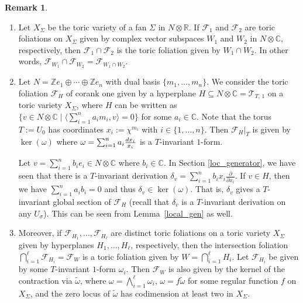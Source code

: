 \documentclass[12pt,reqno]{amsart}
\theoremstyle{definition}
\newtheorem{remark}[theorem]{Remark}
\newcommand{\mc}{\mathcal}
\newcommand\cF{{\mathcal{F}}}
\newcommand\cT{{\mathcal{T}}}
\newcommand\bC{{\mathbb C}}
\newcommand\bR{{\mathbb R}}
\newcommand\bZ{{\mathbb Z}}
\newcommand{\diff}{\textnormal{d}}
\begin{document}
\begin{remark}\label{rmk_properties}
\begin{enumerate}
    \item Let $X_\Sigma$ be the toric variety of a fan $\Sigma$ in $N\otimes\bR$. 
    If $\cF_1$ and $\cF_2$ are toric foliations on $X_\Sigma$ given by complex vector subspaces $W_1$ and $W_2$ in $N\otimes\bC$, respectively, then $\cF_1\cap\cF_2$ is the toric foliation given by $W_1\cap W_2$. 
    In other words, $\cF_{W_1}\cap\cF_{W_2} = \cF_{W_1\cap W_2}$. 
    
    \item Let $N=\bZ e_1\oplus\cdots\oplus\bZ e_n$ with dual basis $\{m_1,\ldots,m_n\}$. 
    We consider the toric foliation $\cF_H$ of corank one given by a hyperplane $H\subseteq N\otimes\bC = \cT_{T,\,1}$ on a toric variety $X_\Sigma$, where $H$ can be written as $\{v\in N\otimes\bC\mid \big\langle \sum_{i=1}^n a_im_i, v\big\rangle = 0\}$ for some $a_i\in\bC$. 
    Note that the torus $T:=U_{0}$ has coordinates $x_i:=\chi^{m_i}$ with $i\in \{1,\ldots,n\}$.  
    Then $\cF_H\vert_T$ is given by $\ker(\omega)$ where $\omega=\sum_{i=1}^n a_i\frac{\diff x_i}{x_i}$ is a $T$-invariant $1$-form. 

    Let $v=\sum_{i=1}^n b_ie_i \in N\otimes\bC$ where $b_i\in\bC$. 
    In Section \ref{loc_generator}, we have seen that there is a $T$-invariant derivation $\delta_v=\sum_{i=1}^n b_ix_i\frac{\partial}{\partial x_i}$.
    If $v\in H$, then we have $\sum_{i=1}^n a_ib_i=0$ and thus
    $\delta_v\in\ker(\omega)$. That is, $\delta_v$ gives a $T$-invariant global section of $\mc F_H$ (recall that $\delta_v$ is a $T$-invariant derivation on any $U_\sigma$). This can be seen from Lemma~\ref{local_gen} as well.

    \item Moreover, if $\cF_{H_1},\ldots,\cF_{H_\ell}$ are distinct toric foliations on a toric variety $X_\Sigma$ given by hyperplanes $H_1,\ldots,H_\ell$, respectively, then the intersection foliation $\bigcap_{i=1}^\ell\cF_{H_i} = \cF_W$ is a toric foliation given by $W=\bigcap_{i=1}^\ell H_i$. 
    Let $\cF_{H_i}$ be given by some $T$-invariant $1$-form $\omega_i$. 
    Then $\cF_W$ is also given by the kernel of the contraction via $\tilde{\omega}$, where $\omega=\bigwedge_{i=1}^\ell\omega_i$, $\omega=f\tilde{\omega}$ for some regular function $f$ on $X_\Sigma$, and the zero locus of $\tilde{\omega}$ has codimension at least two in $X_\Sigma$. 
\end{enumerate}
\end{remark}
\end{document}
